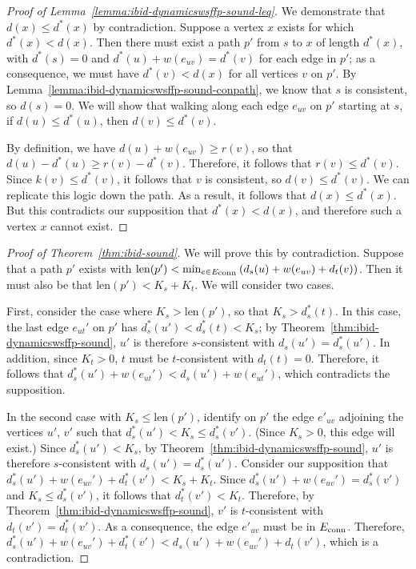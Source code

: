 \begin{proof}[Proof of Lemma~\ref{lemma:ibid-dynamicswsffp-sound-leq}]
We demonstrate that $d(x) \leq d^*(x)$ by contradiction.
Suppose a vertex $x$ exists for which $d^*(x) < d(x)$.
Then there must exist a path $p'$ from $s$ to $x$ of length $d^*(x)$,
with $d^*(s) = 0$ and $d^*(u) + w(e_{uv}) = d^*(v)$ for each edge
in $p'$;
as a consequence,
we must have $d^*(v) < d(x)$ for all vertices $v$ on $p'$.
By Lemma~\ref{lemma:ibid-dynamicswsffp-sound-conpath},
we know that $s$ is consistent,
so $d(s) = 0$.
We will show that walking along
each edge $e_{uv}$ on $p'$ starting at $s$,
if $d(u) \leq d^*(u)$,
then $d(v) \leq d^*(v)$.

By definition,
we have $d(u) + w(e_{uv}) \geq r(v)$,
so that $d(u) - d^*(u) \geq r(v) - d^*(v)$.
Therefore,
it follows that $r(v) \leq d^*(v)$.
Since $k(v) \leq d^*(v)$,
it follows that $v$ is consistent,
so $d(v) \leq d^*(v)$.
We can replicate this logic down the path.
As a result,
it follows that $d(x) \leq d^*(x)$.
But this contradicts our supposition that $d^*(x) < d(x)$,
and therefore such a vertex $x$ cannot exist.
\end{proof}


\begin{proof}[Proof of Theorem~\ref{thm:ibid-sound}]
We will prove this by contradiction.
Suppose that a path $p'$ exists with
$\mbox{len}(p') < \min_{e \in E_{\mbox{\scriptsize conn}}} \left( d_s(u) + w(e_{uv}) + d_t(v) \right)$.
Then it must also be that
$\mbox{len}(p') < K_s + K_t$.
We will consider two cases.

First, consider the case where $K_s > \mbox{len}(p')$,
so that $K_s > d_s^*(t)$.
In this case,
the last edge $e_{ut}'$ on $p'$
has $d_s^*(u') < d_s^*(t) < K_s$;
by Theorem~\ref{thm:ibid-dynamicswsffp-sound},
$u'$ is therefore $s$-consistent with $d_s(u') = d_s^*(u')$.
In addition,
since $K_t > 0$,
$t$ must be $t$-consistent with $d_t(t) = 0$.
Therefore,
it follows that $d_s^*(u') + w(e_{ut}') < d_s(u') + w(e_{ut}')$,
which contradicts the supposition.

In the second case with $K_s \leq \mbox{len}(p')$,
identify on $p'$ the edge $e'_{uv}$ adjoining the vertices $u'$, $v'$
such that $d_s^*(u') < K_s \leq d_s^*(v')$.
(Since $K_s > 0$, this edge will exist.)
Since $d_s^*(u') < K_s$,
by Theorem~\ref{thm:ibid-dynamicswsffp-sound},
$u'$ is therefore $s$-consistent with $d_s(u') = d_s^*(u')$.
Consider our supposition that
$d_s^*(u') + w(e_{uv}') + d_t^*(v') < K_s + K_t$.
Since $d_s^*(u') + w(e_{uv}') = d_s^*(v')$
and $K_s \leq d_s^*(v')$,
it follows that
$d_t^*(v') < K_t$.
Therefore,
by Theorem~\ref{thm:ibid-dynamicswsffp-sound},
$v'$ is $t$-consistent with $d_t(v') = d_t^*(v')$.
As a consequence,
the edge $e'_{uv}$ must be in $E_{\mbox{\scriptsize conn}}$.
Therefore,
$d_s^*(u') + w(e_{uv}') + d_t^*(v')
   < d_s(u') + w(e_{uv}') + d_t(v')$,
which is a contradiction.
\end{proof}
